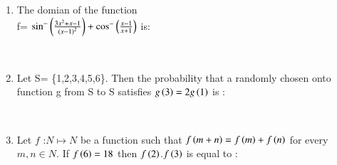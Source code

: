 \documentclass[journal,12pt,twocolumn]{IEEEtran}
\theoremstyle{remark}
\begin{document}
\begin{enumerate}[start=1]
\item 
The domian of the function \\
f= $\sin ^- \left(\frac{3x^2+x-1}{\left(x-1\right)^2}\right)+\cos ^- \left(\frac{x-1}{x+1}\right)$ is:
\begin{enumerate}
\end{enumerate}
\begin{enumerate}
\end{enumerate}
\\


\item 
Let S= \{1,2,3,4,5,6\}. Then the probability that a randomly chosen onto function g from S to S satisfies $g\left(3\right)=2g\left(1\right)$ is :
\begin{enumerate}
\end{enumerate}
\begin{enumerate}
\end{enumerate}
\\

\item 
Let $f$ :$N \mapsto N$ be a  function such that $f\left(m+n\right)=f\left(m\right)+f\left(n\right)$ for every $m,n \in N$. If $f\left(6\right)=18$ then $f\left(2\right)$.$f\left(3\right)$ is equal to :
\begin{enumerate}
\end{enumerate}
\begin{enumerate}
\end{enumerate}
\\


\end{enumerate}
\end{document}

